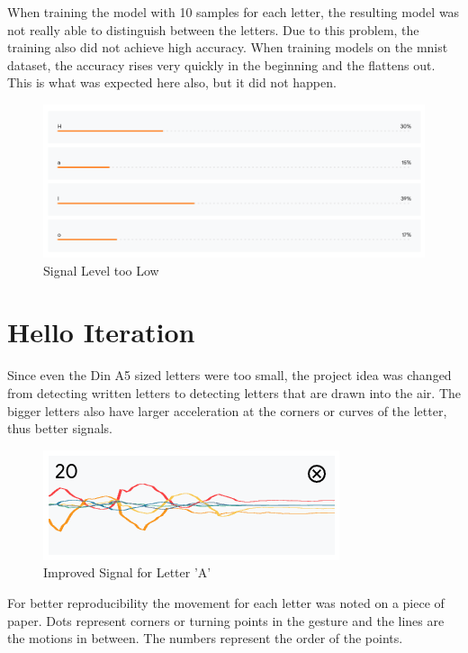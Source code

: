 \documentclass[a4paper,titlepage]{article}
\begin{document}
When training the model with 10 samples for each letter, the resulting model was not really able to distinguish between the letters.
Due to this problem, the training also did not achieve high accuracy.
When training models on the mnist dataset, the accuracy rises very quickly in the beginning and the flattens out.
This is what was expected here also, but it did not happen.

\begin{figure}[H]
    \includegraphics[width=\textwidth]{uncertain_results.png}
    \caption{Signal Level too Low}
\end{figure}

\section{Hello Iteration}

Since even the Din A5 sized letters were too small, the project idea was changed from detecting written letters to detecting letters that are drawn into the air.
The bigger letters also have larger acceleration at the corners or curves of the letter, thus better signals.

\begin{figure}[H]
    \includegraphics[width=\textwidth]{better_signal_A.png}
    \caption{Improved Signal for Letter 'A'}
\end{figure}

For better reproducibility the movement for each letter was noted on a piece of paper.
Dots represent corners or turning points in the gesture and the lines are the motions in between.
The numbers represent the order of the points.
\end{document}
